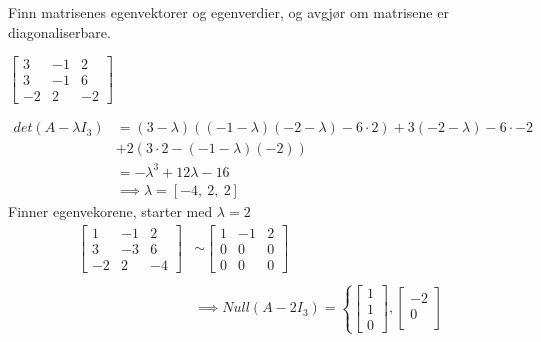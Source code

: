 \documentclass[11pt, a4paper, norsk]{NTNUoving}
\begin{document}
    \begin{oppgave}
        Finn matrisenes egenvektorer og egenverdier, og avgjør om matrisene er diagonaliserbare.
        \begin{punkt}
            $\begin{bmatrix}
                3 & -1 & 2 \\
                3 & -1 & 6 \\
                -2 & 2 & -2
            \end{bmatrix}$
        
            \begin{align*}
                det(A - \lambda I_3) &= (3-\lambda)((-1-\lambda)(-2-\lambda) - 6\cdot 2) + 3(-2-\lambda) - 6 \cdot -2 
                \\
                                     &+ 2(3 \cdot 2 - (-1-\lambda)(-2)) 
                                     \\
                                     &= -\lambda^3 + 12\lambda - 16
                                     \\
                                     &\implies \lambda = \left[ -4, \  2, \ 2\right]
            \end{align*}
            Finner egenvekorene, starter med $\lambda = 2$
            \begin{align*}
                \begin{bmatrix}
                    1 & -1 & 2 \\
                    3 & -3 & 6 \\
                    -2 & 2 & -4
                \end{bmatrix} &\sim \begin{bmatrix}
                1 & -1 & 2 \\
                0 & 0 & 0 \\
                0 & 0 & 0
                \end{bmatrix}
                \\
                \\
                &\implies Null(A - 2I_3) = \left\{\begin{bmatrix}
                    1 \\
                    1 \\
                    0
                \end{bmatrix}, \begin{bmatrix}
                    -2 \\
                    0 \\

\end{bmatrix}
\end{align*}
\end{punkt}
\end{oppgave}
\end{document}
